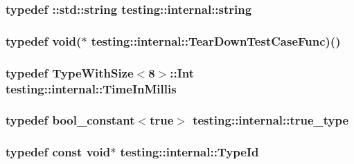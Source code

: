 \hypertarget{namespacetesting_1_1internal_a8e8ff5b11e64078831112677156cb111}{
\subsubsection[{string}]{\setlength{\rightskip}{0pt plus 5cm}typedef \+::std\+::string {\bf testing\+::internal\+::string}}}\label{namespacetesting_1_1internal_a8e8ff5b11e64078831112677156cb111}
\hypertarget{namespacetesting_1_1internal_aad40244621b68546f3b830696225bf9b}{
\subsubsection[{Tear\+Down\+Test\+Case\+Func}]{\setlength{\rightskip}{0pt plus 5cm}typedef void($\ast$ testing\+::internal\+::\+Tear\+Down\+Test\+Case\+Func)()}}\label{namespacetesting_1_1internal_aad40244621b68546f3b830696225bf9b}
\hypertarget{namespacetesting_1_1internal_a66a845df404b38fe85c5e14a069f255a}{
\subsubsection[{Time\+In\+Millis}]{\setlength{\rightskip}{0pt plus 5cm}typedef {\bf Type\+With\+Size}$<$8$>$\+::Int {\bf testing\+::internal\+::\+Time\+In\+Millis}}}\label{namespacetesting_1_1internal_a66a845df404b38fe85c5e14a069f255a}
\hypertarget{namespacetesting_1_1internal_a62f917c3424d8841de9b49b5ec28edb4}{
\subsubsection[{true\+\_\+type}]{\setlength{\rightskip}{0pt plus 5cm}typedef {\bf bool\+\_\+constant}$<$true$>$ {\bf testing\+::internal\+::true\+\_\+type}}}\label{namespacetesting_1_1internal_a62f917c3424d8841de9b49b5ec28edb4}
\hypertarget{namespacetesting_1_1internal_ab1114197d3c657d8b7f8e0c5caa12d00}{
\subsubsection[{Type\+Id}]{\setlength{\rightskip}{0pt plus 5cm}typedef const void$\ast$ {\bf testing\+::internal\+::\+Type\+Id}}}\label{namespacetesting_1_1internal_ab1114197d3c657d8b7f8e0c5caa12d00}
